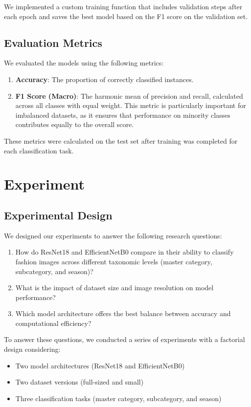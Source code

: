 \documentclass[10pt,journal,compsoc]{IEEEtran}
\begin{document}
We implemented a custom training function that includes validation steps after each epoch and saves the best model based on the F1 score on the validation set.

\subsection{Evaluation Metrics}
We evaluated the models using the following metrics:

\begin{enumerate}
\item \textbf{Accuracy}: The proportion of correctly classified instances.
\item \textbf{F1 Score (Macro)}: The harmonic mean of precision and recall, calculated across all classes with equal weight. This metric is particularly important for imbalanced datasets, as it ensures that performance on minority classes contributes equally to the overall score.
\end{enumerate}

These metrics were calculated on the test set after training was completed for each classification task.

\section{Experiment}

\subsection{Experimental Design}
We designed our experiments to answer the following research questions:

\begin{enumerate}
\item How do ResNet18 and EfficientNetB0 compare in their ability to classify fashion images across different taxonomic levels (master category, subcategory, and season)?
\item What is the impact of dataset size and image resolution on model performance?
\item Which model architecture offers the best balance between accuracy and computational efficiency?
\end{enumerate}

To answer these questions, we conducted a series of experiments with a factorial design considering:

\begin{itemize}
\item Two model architectures (ResNet18 and EfficientNetB0)
\item Two dataset versions (full-sized and small)
\item Three classification tasks (master category, subcategory, and season)
\end{itemize}
\end{document}

